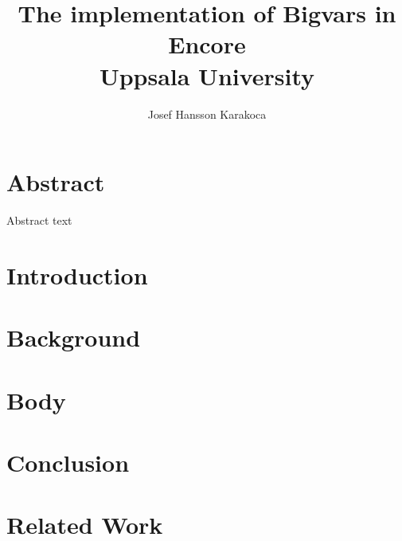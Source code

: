 \documentclass[12]{report}
\title{
    {The implementation of Bigvars in Encore}\\
    {Uppsala University}
    }
\author{Josef Hansson Karakoca }
\begin{document}
\maketitle

\chapter*{Abstract}
Abstract text

\tableofcontents

\chapter{Introduction}


\chapter{Background}


\chapter{Body}


\chapter{Conclusion}


\chapter{Related Work}













\end{document}
